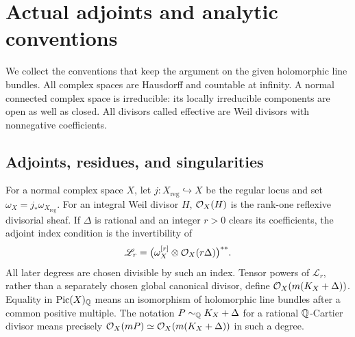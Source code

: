 \section{Actual adjoints and analytic conventions}\label{sec:conventions}

We collect the conventions that keep the argument on the given
holomorphic line bundles.  All complex spaces are Hausdorff and countable
at infinity.  A normal connected complex space is irreducible: its locally
irreducible components are open as well as closed.  All divisors called
effective are Weil divisors with nonnegative coefficients.

\subsection{Adjoints, residues, and singularities}

For a normal complex space \(X\), let \(j:X_{\mathrm{reg}}\hookrightarrow X\)
be the regular locus and set \(\omega_X=j_*\omega_{X_{\mathrm{reg}}}\).
For an integral Weil divisor \(H\), \(\mathcal O_X(H)\) is the rank-one reflexive
divisorial sheaf.  If \(\Delta\) is rational and an integer \(r>0\)
clears its coefficients, the adjoint index condition is the invertibility
of
\begin{equation}
 \mathscr L_r=\bigl(\omega_X^{[r]}\otimes\mathcal O_X(r\Delta)\bigr)^{**}.
 \label{eq:actual-adjoint}
\end{equation}
All later degrees are chosen divisible by such an index.  Tensor powers
of \(\mathscr L_r\), rather than a separately chosen global canonical
divisor, define \(\mathcal O_X(m(K_X+\Delta))\).  Equality in \(\operatorname{Pic}(X)_\mathbb Q\)
means an isomorphism of holomorphic line bundles after a common positive
multiple.  The notation \(P\sim_\mathbb Q K_X+\Delta\) for a rational
\(\mathbb Q\)-Cartier divisor means precisely
\(\mathcal O_X(mP)\simeq\mathcal O_X(m(K_X+\Delta))\) in such a degree.

